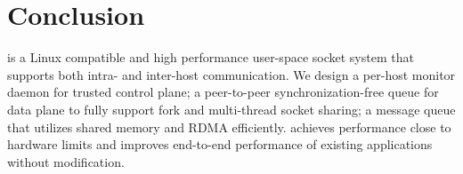 \section{Conclusion}
\label{sec:conclusion}

\sys{} is a Linux compatible and high performance user-space socket system that supports both intra- and inter-host communication.
We design a per-host monitor daemon for trusted control plane;
a peer-to-peer synchronization-free queue for data plane to fully support fork and multi-thread socket sharing;
a message queue that utilizes shared memory and RDMA efficiently.
\sys{} achieves performance close to hardware limits and improves end-to-end performance of existing applications without modification.

